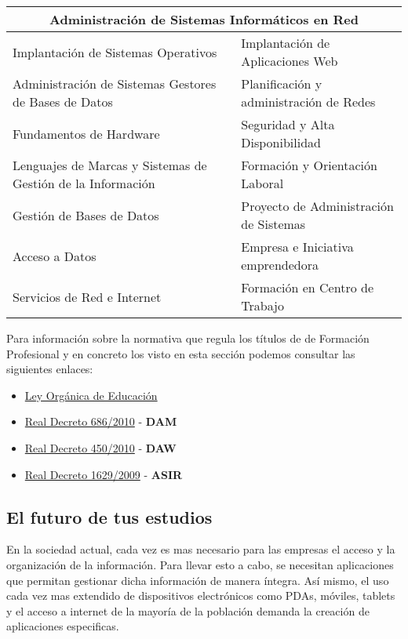 \begin{center}
 \begin{table}[ht]
    {\renewcommand{\arraystretch}{1.5}
        \begin{tabular}[c]{ |l|l| }
            \hline
            \multicolumn{2}{|c|}{\textbf{Administración de Sistemas Informáticos en Red}} \\ \hline
            Implantación de Sistemas Operativos &  Implantación de Aplicaciones Web\\ \hline
            Administración de Sistemas Gestores de Bases de Datos & Planificación y administración de Redes \\ \hline
            Fundamentos de Hardware & Seguridad y Alta Disponibilidad \\ \hline
            Lenguajes de Marcas y Sistemas de Gestión de la Información & Formación y Orientación Laboral \\ \hline
            Gestión de Bases de Datos & Proyecto de Administración de Sistemas \\ \hline
            Acceso a Datos & Empresa e Iniciativa emprendedora \\ \hline
            Servicios de Red e Internet & Formación en Centro de Trabajo \\ \hline
    \end{tabular}}
 \end{table}
\end{center}

Para información sobre la normativa que regula los títulos de de Formación Profesional y en concreto los visto en esta sección podemos consultar las siguientes enlaces:

\begin{itemize}
    \item \href{https://www.boe.es/buscar/doc.php?id=BOE-A-2006-7899}{Ley Orgánica de Educación}
    \item \href{https://www.boe.es/boe/dias/2010/05/20/pdfs/BOE-A-2010-8067.pdf}{Real Decreto 686/2010} - \textbf{DAM}
    \item \href{https://www.boe.es/boe/dias/2010/06/12/pdfs/BOE-A-2010-9269.pdf}{Real Decreto 450/2010} - \textbf{DAW}
    \item \href{https://www.boe.es/boe/dias/2009/11/18/pdfs/BOE-A-2009-18355.pdf}{Real Decreto 1629/2009} - \textbf{ASIR}
\end{itemize}

\subsection{El futuro de tus estudios}
En la sociedad actual, cada vez es mas necesario para las empresas el acceso y la organización de la información. Para llevar esto a cabo, se necesitan aplicaciones que permitan gestionar dicha información de manera íntegra. Así mismo, el uso cada vez mas extendido de dispositivos electrónicos como PDAs, móviles, tablets y el acceso a internet de la mayoría de la población demanda la creación de aplicaciones especificas.

